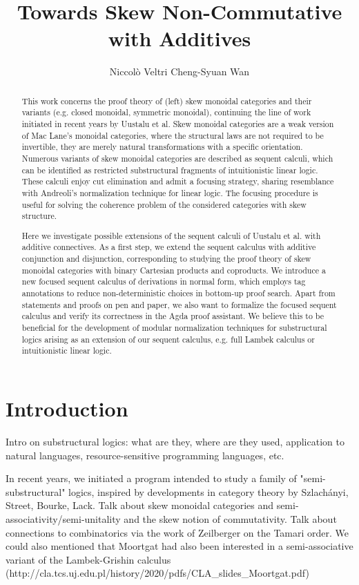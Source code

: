 \documentclass[submission,copyright,creativecommons]{eptcs}
\title{Towards Skew Non-Commutative \MILL \text{ }with Additives}
\author{
Niccol{\`o} Veltri \qquad\qquad Cheng-Syuan Wan
\institute{Tallinn University of Technology, Estonia}
\email{\quad niccolo@cs.ioc.ee \quad\qquad cswan@cs.ioc.ee}
}
\theoremstyle{definition}
\begin{document}
\maketitle
\begin{abstract}
This work concerns the proof theory of (left) skew monoidal categories and their variants (e.g. closed monoidal, symmetric monoidal), continuing the line of work initiated in recent years by Uustalu et al.
Skew monoidal categories are a weak version of Mac Lane's monoidal categories, where the structural laws are not required to be invertible, they are merely natural transformations with a specific orientation. 
Numerous variants of skew monoidal categories are described as sequent calculi, which can be identified as restricted substructural fragments of intuitionistic linear logic. These calculi enjoy cut elimination and admit a focusing strategy, sharing resemblance with Andreoli's normalization technique for linear logic. The focusing procedure is useful for solving the coherence problem of the considered categories with skew structure.

Here we investigate possible extensions of the sequent calculi of Uustalu et al. with additive connectives. 
As a first step, we extend the sequent calculus with additive conjunction and disjunction, corresponding to studying the proof theory of skew monoidal categories with binary Cartesian products and coproducts. 
We introduce a new focused sequent calculus of derivations in normal form, which employs tag annotations to reduce non-deterministic choices in bottom-up proof search.
Apart from statements and proofs on pen and paper, we also want to formalize the focused sequent calculus and verify its correctness in the Agda proof assistant.
We believe this to be beneficial for the development of modular normalization techniques for substructural logics arising as an extension of our sequent calculus, e.g. full Lambek calculus or intuitionistic linear logic.
\end{abstract}

\section{Introduction}

Intro on substructural logics: what are they, where are they used, application to natural languages, resource-sensitive programming languages, etc. 

In recent years, we initiated a program intended to study a family of "semi-substructural" logics, inspired by developments in category theory by Szlachányi, Street, Bourke, Lack. Talk about skew monoidal categories and semi-associativity/semi-unitality and the skew notion of commutativity. Talk about connections to combinatorics via the work of Zeilberger on the Tamari order. We could also mentioned that Moortgat had also been interested in a semi-associative variant of the Lambek-Grishin calculus (http://cla.tcs.uj.edu.pl/history/2020/pdfs/CLA_slides_Moortgat.pdf)
\end{document}
